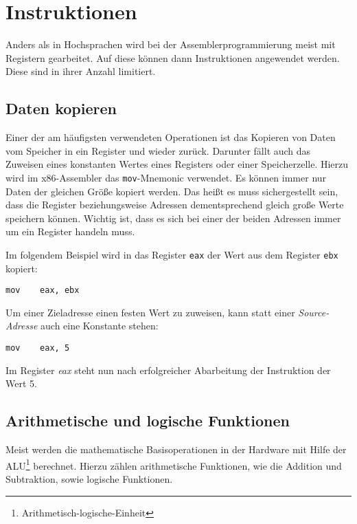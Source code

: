 \section{Instruktionen}

Anders als in Hochsprachen wird bei der Assemblerprogrammierung meist mit Registern gearbeitet.
Auf diese können dann Instruktionen angewendet werden. Diese sind in ihrer Anzahl limitiert.

\subsection{Daten kopieren}
Einer der am häufigsten verwendeten Operationen ist das Kopieren von Daten vom Speicher in ein Register und wieder zurück.
Darunter fällt auch das Zuweisen eines konstanten Wertes eines Registers oder einer Speicherzelle.
Hierzu wird im x86-Assembler das \texttt{mov}-Mnemonic verwendet.
Es können immer nur Daten der gleichen Größe kopiert werden.
Das heißt es muss sichergestellt sein, dass die Register beziehungsweise Adressen dementsprechend gleich große Werte speichern können.
Wichtig ist, dass es sich bei einer der beiden Adressen immer um ein Register handeln muss.

Im folgendem Beispiel wird in das Register \texttt{eax} der Wert aus dem Register \texttt{ebx} kopiert:

\begin{lstlisting}
mov    eax, ebx
\end{lstlisting}

Um einer Zieladresse einen festen Wert zu zuweisen, kann statt einer \textit{Source-Adresse} auch eine Konstante stehen:

\begin{lstlisting}
mov    eax, 5
\end{lstlisting}

Im Register \textit{eax} steht nun nach erfolgreicher Abarbeitung der Instruktion der Wert 5.


\subsection{Arithmetische und logische Funktionen}
Meist werden die mathematische Basisoperationen in der Hardware mit Hilfe der ALU\footnote{Arithmetisch-logische-Einheit} berechnet.
Hierzu zählen arithmetische Funktionen, wie die Addition und Subtraktion, sowie logische Funktionen.

